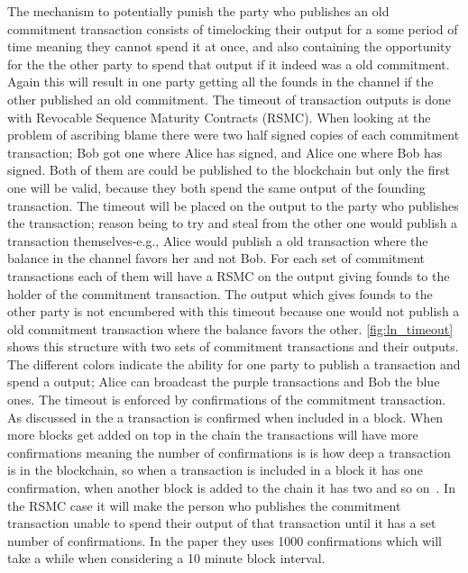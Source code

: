 The mechanism to potentially punish the party who publishes an old commitment transaction consists of timelocking their output for a some period of time meaning they cannot spend it at once, and also containing the opportunity for the the other party to spend that output if it indeed was a old commitment. Again this will result in one party getting all the founds in the channel if the other published an old commitment. The timeout of transaction outputs is done with Revocable Sequence Maturity Contracts (RSMC). When looking at the problem of ascribing blame there were two half signed copies of each commitment transaction; Bob got one where Alice has signed, and Alice one where Bob has signed. Both of them are could be published to the blockchain but only the first one will be valid, because they both spend the same output of the founding transaction. The timeout will be placed on the output to the party who publishes the transaction; reason being to try and steal from the other one would publish a transaction themselves-e.g., Alice would publish a old transaction where the balance in the channel favors her and not Bob. For each set of commitment transactions each of them will have a RSMC on the output giving founds to the holder of the commitment transaction. The output which gives founds to the other party is not encumbered with this timeout because one would not publish a old commitment transaction where the balance favors the other. 
\cref{fig:ln_timeout} shows this structure with two sets of commitment transactions and their outputs. The different colors indicate the ability for one party to publish a transaction and spend a output; Alice can broadcast the purple transactions and Bob the blue ones. The timeout is enforced by confirmations of the commitment transaction. As discussed in the  a transaction is confirmed when included in a block. When more blocks get added on top in the chain the transactions will have more confirmations meaning the number of confirmations is is how deep a transaction is in the blockchain, so when a transaction is included in a block it has one confirmation, when another block is added to the chain it has two and so on~\cite{antonopoulos2017mastering}. In the RSMC case it will make the person who publishes the commitment transaction unable to spend their output of that transaction until it has a set number of confirmations. In the paper they uses 1000 confirmations which will take a while when considering a 10 minute block interval.

